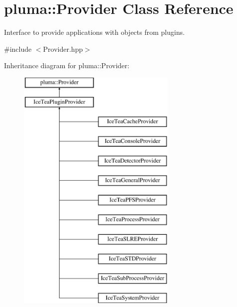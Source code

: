 \hypertarget{classpluma_1_1_provider}{}\section{pluma\+:\+:Provider Class Reference}
\label{classpluma_1_1_provider}


Interface to provide applications with objects from plugins.  




{\ttfamily \#include $<$Provider.\+hpp$>$}

Inheritance diagram for pluma\+:\+:Provider\+:\begin{figure}[H]
\begin{center}
\leavevmode
\includegraphics[height=12.000000cm]{classpluma_1_1_provider}
\end{center}
\end{figure}
